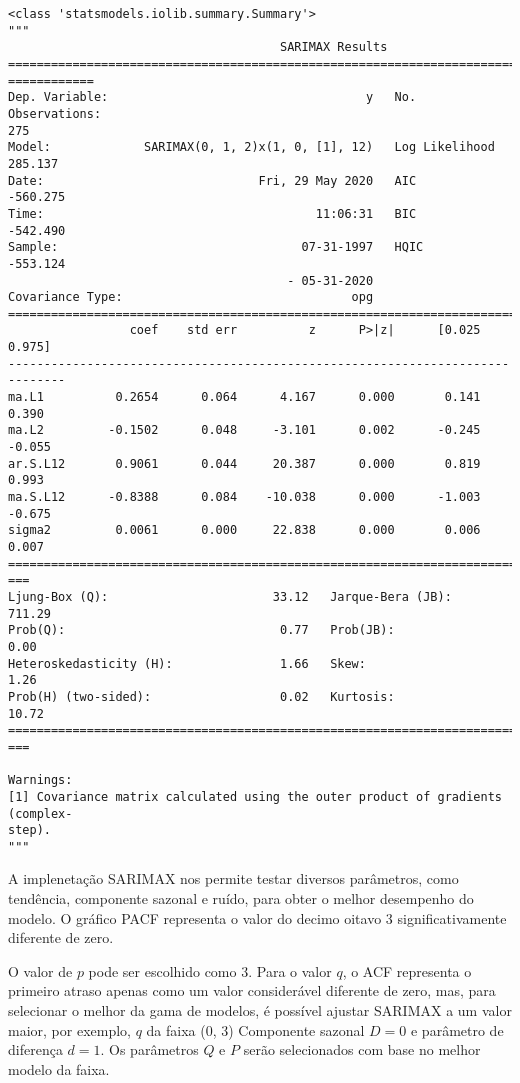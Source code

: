 \documentclass[11pt]{article}
\makeatletter
\newcommand{\boxspacing}{\kern\kvtcb@left@rule\kern\kvtcb@boxsep}
\newcommand{\prompt}[4]{
        \ttfamily\llap{{\color{#2}[#3]:\hspace{3pt}#4}}\vspace{-\baselineskip}
    }
\makeatother
\begin{document}
            \begin{tcolorbox}[breakable, size=fbox, boxrule=.5pt, pad at break*=1mm, opacityfill=0]
\prompt{Out}{outcolor}{36}{\boxspacing}
\begin{Verbatim}[commandchars=\\\{\}]
<class 'statsmodels.iolib.summary.Summary'>
"""
                                      SARIMAX Results
================================================================================
============
Dep. Variable:                                    y   No. Observations:
275
Model:             SARIMAX(0, 1, 2)x(1, 0, [1], 12)   Log Likelihood
285.137
Date:                              Fri, 29 May 2020   AIC
-560.275
Time:                                      11:06:31   BIC
-542.490
Sample:                                  07-31-1997   HQIC
-553.124
                                       - 05-31-2020
Covariance Type:                                opg
==============================================================================
                 coef    std err          z      P>|z|      [0.025      0.975]
------------------------------------------------------------------------------
ma.L1          0.2654      0.064      4.167      0.000       0.141       0.390
ma.L2         -0.1502      0.048     -3.101      0.002      -0.245      -0.055
ar.S.L12       0.9061      0.044     20.387      0.000       0.819       0.993
ma.S.L12      -0.8388      0.084    -10.038      0.000      -1.003      -0.675
sigma2         0.0061      0.000     22.838      0.000       0.006       0.007
================================================================================
===
Ljung-Box (Q):                       33.12   Jarque-Bera (JB):
711.29
Prob(Q):                              0.77   Prob(JB):
0.00
Heteroskedasticity (H):               1.66   Skew:
1.26
Prob(H) (two-sided):                  0.02   Kurtosis:
10.72
================================================================================
===

Warnings:
[1] Covariance matrix calculated using the outer product of gradients (complex-
step).
"""
\end{Verbatim}
\end{tcolorbox}
        
    A implenetação SARIMAX nos permite testar diversos parâmetros, como
tendência, componente sazonal e ruído, para obter o melhor desempenho do
modelo. O gráfico PACF representa o valor do decimo oitavo 3
significativamente diferente de zero.

O valor de \(p\) pode ser escolhido como \(3\). Para o valor \(q\), o
ACF representa o primeiro atraso apenas como um valor considerável
diferente de zero, mas, para selecionar o melhor da gama de modelos, é
possível ajustar SARIMAX a um valor maior, por exemplo, \(q\) da faixa
(0, 3) Componente sazonal \(D = 0\) e parâmetro de diferença \(d = 1\).
Os parâmetros \(Q\) e \(P\) serão selecionados com base no melhor modelo
da faixa.
\end{document}
